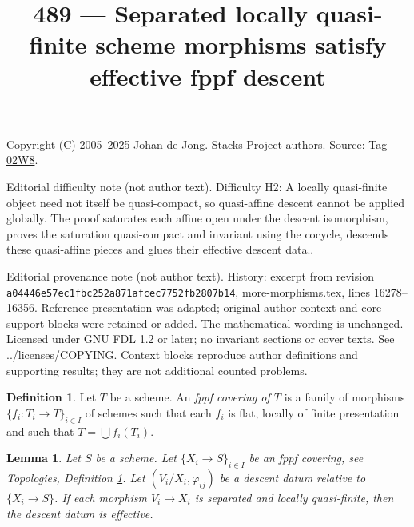 \documentclass{amsart}
\theoremstyle{plain}
\newtheorem{lemma}[subsection]{Lemma}
\theoremstyle{definition}
\newtheorem{definition}[subsection]{Definition}
\theoremstyle{remark}
\numberwithin{equation}{subsection}
\begin{document}
\title[Stacks Project, Tag 02W8]{489 --- Separated locally quasi-finite scheme morphisms satisfy effective fppf descent}
\maketitle
\noindent Copyright (C) 2005--2025 Johan de Jong. Stacks Project authors. Source: \href{https://stacks.math.columbia.edu/tag/02W8}{Tag 02W8}.

\noindent Editorial difficulty note (not author text). Difficulty H2: A locally quasi-finite object need not itself be quasi-compact, so quasi-affine descent cannot be applied globally. The proof saturates each affine open under the descent isomorphism, proves the saturation quasi-compact and invariant using the cocycle, descends these quasi-affine pieces and glues their effective descent data..

\noindent Editorial provenance note (not author text). History: excerpt from revision \texttt{a0444\allowbreak 6e57e\allowbreak c1fbc\allowbreak 252a8\allowbreak 71afc\allowbreak ec775\allowbreak 2fb28\allowbreak 07b14}, more-morphisms.tex, lines 16278--16356. Reference presentation was adapted; original-author context and core support blocks were retained or added. The mathematical wording is unchanged. Licensed under GNU FDL 1.2 or later; no invariant sections or cover texts. See ../licenses/COPYING. Context blocks reproduce author definitions and supporting results; they are not additional counted problems.

\begin{definition}
\label{topologies-definition-fppf-covering}
Let $T$ be a scheme. An {\it fppf covering of $T$} is a family
of morphisms $\{f_i : T_i \to T\}_{i \in I}$ of schemes
such that each $f_i$ is flat, locally of finite presentation and such
that $T = \bigcup f_i(T_i)$.
\end{definition}

\begin{lemma}
\label{lemma-separated-locally-quasi-finite-morphisms-fppf-descend}
Let $S$ be a scheme.
Let $\{X_i \to S\}_{i\in I}$ be an fppf covering, see
Topologies, Definition \ref{topologies-definition-fppf-covering}.
Let $(V_i/X_i, \varphi_{ij})$ be a descent datum
relative to $\{X_i \to S\}$. If each morphism
$V_i \to X_i$ is separated and locally quasi-finite,
then the descent datum is effective.
\end{lemma}
\end{document}
